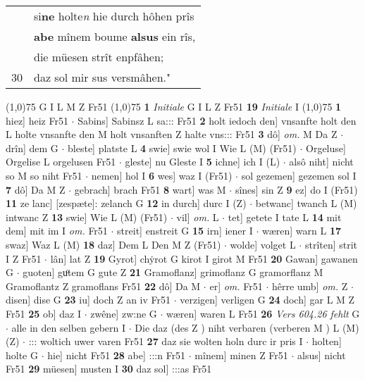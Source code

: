 \documentclass[8pt,a4paper,notitlepage]{article}
\begin{document}
\begin{table}[ht]
\begin{minipage}[t]{0.5\linewidth}
\begin{tabular}{rl}
 & si\textbf{ne} holte\textit{n} hie durch hôhen prîs\\ 
 & \textbf{abe} mînem boume \textbf{alsus} ein rîs,\\ 
 & die müesen strît enpfâhen;\\ 
30 & daz sol mir sus versmâhen."\\ 
\end{tabular}
\scriptsize
\line(1,0){75} \newline
G I L M Z Fr51 \newline
\line(1,0){75} \newline
\textbf{1} \textit{Initiale} G I L Z Fr51  \textbf{19} \textit{Initiale} I  \newline
\line(1,0){75} \newline
\textbf{1} hiez] heiz Fr51  $\cdot$ Sabins] Sabinsz L sa::: Fr51 \textbf{2} holt iedoch den] vnsanfte holt den L holte vnsanfte den M holt vnsanften Z halte vns::: Fr51 \textbf{3} dô] \textit{om.} M Da Z  $\cdot$ drîn] dem G  $\cdot$ bleste] platste L \textbf{4} swie] swie wol I Wie L (M) (Fr51)  $\cdot$ Orgeluse] Orgelise L orgelusen Fr51  $\cdot$ gleste] nu Gleste I \textbf{5} ichne] ich I (L)  $\cdot$ alsô niht] nicht so M so niht Fr51  $\cdot$ nemen] hol I \textbf{6} wes] waz I (Fr51)  $\cdot$ sol gezemen] gezemen sol I \textbf{7} dô] Da M Z  $\cdot$ gebrach] brach Fr51 \textbf{8} wart] was M  $\cdot$ sînes] sin Z \textbf{9} ez] do I (Fr51) \textbf{11} ze lanc] [zespæte]: zelanch G \textbf{12} in durch] durc I (Z)  $\cdot$ betwanc] twanch L (M) intwanc Z \textbf{13} swie] Wie L (M) (Fr51)  $\cdot$ vil] \textit{om.} L  $\cdot$ tet] getete I tate L \textbf{14} mit dem] mit im I \textit{om.} Fr51  $\cdot$ streit] enstreit G \textbf{15} irn] iener I  $\cdot$ wæren] warn L \textbf{17} swaz] Waz L (M) \textbf{18} daz] Dem L Den M Z (Fr51)  $\cdot$ wolde] volget L  $\cdot$ strîten] strit I Z Fr51  $\cdot$ lân] lat Z \textbf{19} Gyrot] chẏrot G kirot I girot M Fr51 \textbf{20} Gawan] gawanen G  $\cdot$ guoten] guͦtem G gute Z \textbf{21} Gramoflanz] grimoflanz G gramorflanz M Gramoflantz Z gramoflans Fr51 \textbf{22} dô] Da M  $\cdot$ er] \textit{om.} Fr51  $\cdot$ hêrre umb] \textit{om.} Z  $\cdot$ disen] dise G \textbf{23} iu] doch Z an iv Fr51  $\cdot$ verzigen] verligen G \textbf{24} doch] gar L M Z Fr51 \textbf{25} ob] daz I  $\cdot$ zwêne] zw:ne G  $\cdot$ wæren] waren L Fr51 \textbf{26} \textit{Vers 604.26 fehlt} G   $\cdot$ alle in den selben gebern I  $\cdot$ Die daz (des Z ) niht verbaren (verberen M ) L (M) (Z)  $\cdot$ ::: woltich uwer varen Fr51 \textbf{27} daz sie wolten holn durc ir pris I  $\cdot$ holten] holte G  $\cdot$ hie] nicht Fr51 \textbf{28} abe] :::n Fr51  $\cdot$ mînem] minen Z Fr51  $\cdot$ alsus] nicht Fr51 \textbf{29} müesen] musten I \textbf{30} daz sol] :::as Fr51 \newline

\end{minipage}
\end{table}
\end{document}
